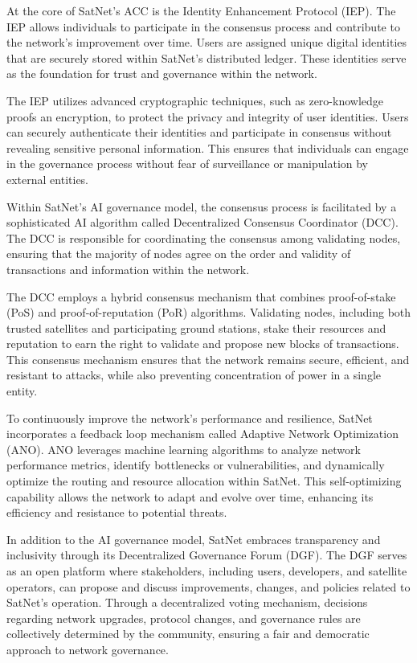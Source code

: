 \documentclass{article}
\theoremstyle{theorem}
\theoremstyle{definition}
\theoremstyle{remark}
\begin{document}
At the core of SatNet's ACC is the Identity Enhancement Protocol (IEP). The IEP allows individuals to participate in the consensus process and contribute to the network's improvement over time. Users are assigned unique digital identities that are securely stored within SatNet's distributed ledger. These identities serve as the foundation for trust and governance within the network.

The IEP utilizes advanced cryptographic techniques, such as zero-knowledge proofs an encryption, to protect the privacy and integrity of user identities. Users can securely authenticate their identities and participate in consensus without revealing sensitive personal information. This ensures that individuals can engage in the governance process without fear of surveillance or manipulation by external entities.

Within SatNet's AI governance model, the consensus process is facilitated by a sophisticated AI algorithm called Decentralized Consensus Coordinator (DCC). The DCC is responsible for coordinating the consensus among validating nodes, ensuring that the majority of nodes agree on the order and validity of transactions and information within the network.

The DCC employs a hybrid consensus mechanism that combines proof-of-stake (PoS) and proof-of-reputation (PoR) algorithms. Validating nodes, including both trusted satellites and participating ground stations, stake their resources and reputation to earn the right to validate and propose new blocks of transactions. This consensus mechanism ensures that the network remains secure, efficient, and resistant to attacks, while also preventing concentration of power in a single entity.

To continuously improve the network's performance and resilience, SatNet incorporates a feedback loop mechanism called Adaptive Network Optimization (ANO). ANO leverages machine learning algorithms to analyze network performance metrics, identify bottlenecks or vulnerabilities, and dynamically optimize the routing and resource allocation within SatNet. This self-optimizing capability allows the network to adapt and evolve over time, enhancing its efficiency and resistance to potential threats.

In addition to the AI governance model, SatNet embraces transparency and inclusivity through its Decentralized Governance Forum (DGF). The DGF serves as an open platform where stakeholders, including users, developers, and satellite operators, can propose and discuss improvements, changes, and policies related to SatNet's operation. Through a decentralized voting mechanism, decisions regarding network upgrades, protocol changes, and governance rules are collectively determined by the community, ensuring a fair and democratic approach to network governance.
\end{document}
